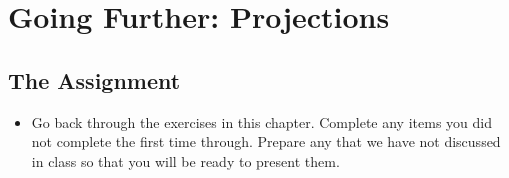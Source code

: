 \documentclass[10pt,]{book}
\theoremstyle{plain}
\theoremstyle{definition}
\numberwithin{equation}{section}
\begin{document}
\section[Going Further: Projections]{Going Further: Projections}\label{section-gf-proj}
\typeout{************************************************}
\typeout{************************************************}
\subsection[The Assignment]{The Assignment}\label{subsection-102}
\begin{itemize}
\item{}
        Go back through the exercises in this chapter. Complete any items you
        did not complete the first time through. Prepare any that we have not
        discussed in class so that you will be ready to present them.
      \end{itemize}
\typeout{************************************************}
\typeout{************************************************}
\end{document}
